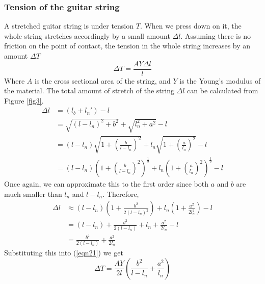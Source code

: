 \documentclass[11pt]{article}
\begin{document}
\begin{flushleft}
            \subsubsection*{Tension of the guitar string}
                A stretched guitar string is under tension $T$. When we press down on it, the whole string stretches accordingly by a small amount $\Delta l$. Assuming there is no friction on the point of contact, the tension in the whole string increases by an amount $\Delta T$
                \begin{equation}
                    \Delta T = \frac{AY\Delta l}{l}\label{eqn21}
                \end{equation} 
                Where $A$ is the cross sectional area of the string, and $Y$ is the Young's modulus of the material.
                The total amount of stretch of the string $\Delta l$ can be calculated from Figure \ref{fig3}. 
                \begin{align}
                    \Delta l &= (l_b + l_n') - l \\
                    &= \sqrt{(l-l_n)^2+b^2} + \sqrt{l_n^2+a^2} - l \\
                    &= (l-l_n)\sqrt{1+\left(\frac{b}{l-l_n}\right)^2} + l_n\sqrt{1+\left(\frac{a}{l_n}\right)^2} - l\\
                    &= (l-l_n)\left(1+\left(\frac{b}{l-l_n}\right)^2\right)^{\frac{1}{2}} + l_n\left(1+\left(\frac{a}{l_n}\right)^2\right)^{\frac{1}{2}} - l
                \end{align}
                Once again, we can approximate this to the first order since both $a$ and $b$ are much smaller than $l_n$ and $l-l_n$. Therefore,
                \begin{align}
                    \Delta l &\approx (l-l_n)\left(1+\frac{b^2}{2(l-l_n)^2}\right)+ l_n\left(1+\frac{a^2}{2l_n^2}\right) - l \\
                    &= (l - l_n) + \frac{b^2}{2(l-l_n)} + l_n + \frac{a^2}{2l_n} - l \\
                    &= \frac{b^2}{2(l-l_n)} + \frac{a^2}{2l_n}
                \end{align}
                Substituting this into (\ref{eqn21}) we get
                \begin{equation}
                    \Delta T = \frac{AY}{2l} \left( \frac{b^2}{l-l_n} + \frac{a^2}{l_n} \right) \label{eqn29}
                \end{equation}

\end{flushleft}
\end{document}
